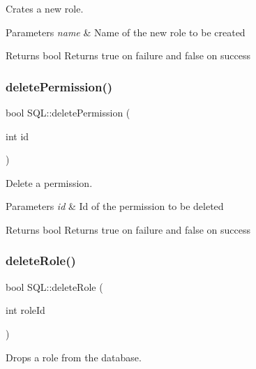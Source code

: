 Crates a new role. 


\begin{DoxyParams}{Parameters}
{\em name} & Name of the new role to be created \\
\hline
\end{DoxyParams}
\begin{DoxyReturn}{Returns}
{\ttfamily bool} Returns true on failure and false on success 
\end{DoxyReturn}
\mbox{\label{class_s_q_l_a9f0cbf3bec8654c33fd24e41d84f6c6a}} 
\subsubsection{\texorpdfstring{delete\+Permission()}{deletePermission()}}
{\footnotesize\ttfamily bool S\+Q\+L\+::delete\+Permission (\begin{DoxyParamCaption}\item[{int}]{id }\end{DoxyParamCaption})}



Delete a permission. 


\begin{DoxyParams}{Parameters}
{\em id} & Id of the permission to be deleted \\
\hline
\end{DoxyParams}
\begin{DoxyReturn}{Returns}
{\ttfamily bool} Returns true on failure and false on success 
\end{DoxyReturn}
\mbox{\label{class_s_q_l_a73b473f7777bccbe8ccb0e2fa6a122ba}} 
\subsubsection{\texorpdfstring{delete\+Role()}{deleteRole()}}
{\footnotesize\ttfamily bool S\+Q\+L\+::delete\+Role (\begin{DoxyParamCaption}\item[{int}]{role\+Id }\end{DoxyParamCaption})}



Drops a role from the database. 



